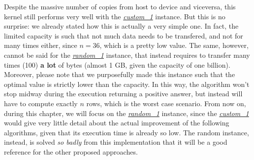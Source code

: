 \documentclass[12pt]{extarticle}
\begin{document}
Despite the massive number of copies from host to device and viceversa, this kernel still performs very well with the \hyperref[custom-1]{\emph{custom\_1}} instance. But this is no surprise: we already stated how this is actually a very simple one. In fact, the limited capacity is such that not much data needs to be transfered, and not for many times either, since $n = 36$, which is a pretty low value. The same, however, cannot be said for the \hyperref[random-1]{\emph{random\_1}} instance, that instead requires to transfer many times (100) \textbf{a lot} of bytes (almost 1 GB, given the capacity of one billion). Moreover, please note that we purposefully made this instance such that the optimal value is strictly lower than the capacity. In this way, the algorithm won't stop midway during the execution returning a positive answer, but instead will have to compute exactly $n$ rows, which is the worst case scenario. From now on, during this chapter, we will focus on the \hyperref[random-1]{\emph{random\_1}} instance, since the \hyperref[custom-1]{\emph{custom\_1}} would give very little detail about the actual improvement of the following algorithms, given that its execution time is already so low. The random instance, instead, is solved \emph{so badly} from this implementation that it will be a good reference for the other proposed approaches.
\end{document}
